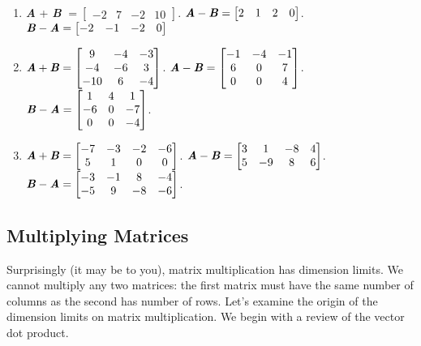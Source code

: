 \begin{Answer}[ref = add_mat]
\begin{enumerate}
\item \textbf{\textit{A}} + \textbf{\textit{B}} $= \begin{bmatrix}
-2 & 7 & -2 & 10
\end{bmatrix}$. $\textbf{\textit{A}} - \textbf{\textit{B}} = \begin{bmatrix}
2 & 1 & 2 & 0
\end{bmatrix}$. $\textbf{\textit{B}} - \textbf{\textit{A}} = \begin{bmatrix}
-2 & -1 & -2 & 0
\end{bmatrix}$
\item $\textbf{\textit{A}} + \textbf{\textit{B}} = \begin{bmatrix}
9 & -4 & -3\\
-4 & -6 & 3\\
-10 & 6 & -4
\end{bmatrix}$. $\textbf{\textit{A}} - \textbf{\textit{B}} = \begin{bmatrix}
-1 & -4 & -1\\
6 & 0 & 7\\
0 & 0 & 4
\end{bmatrix}$. $\textbf{\textit{B}} - \textbf{\textit{A}} = \begin{bmatrix}
1 & 4 & 1\\
-6 & 0 & -7\\
0 & 0 & -4
\end{bmatrix}$.
\item $\textbf{\textit{A}} + \textbf{\textit{B}} = \begin{bmatrix}
-7 & -3 & -2 & -6\\
5 & 1 & 0 & 0
\end{bmatrix}$. $\textbf{\textit{A}} - \textbf{\textit{B}} = \begin{bmatrix}
3 & 1 & -8 & 4\\
5 & -9 & 8 & 6
\end{bmatrix}$. $\textbf{\textit{B}} - \textbf{\textit{A}} = \begin{bmatrix}
-3 & -1 & 8 & -4\\
-5 & 9 & -8 & -6
\end{bmatrix}$.
\end{enumerate}
\end{Answer}

\subsection{Multiplying Matrices}
Surprisingly (it may be to you), matrix multiplication has dimension limits.
We cannot multiply any two matrices: the first matrix must have the same
number of columns as the second has number of rows. Let's examine the origin
of the dimension limits on matrix multiplication. We begin with a review of
the vector dot product.

